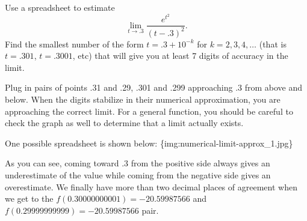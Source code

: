\documentclass{ximera}
\author{Emma Smith Zbarsky}
\begin{document}
\begin{exercise}

Use a spreadsheet to estimate
\[\lim_{t\to .3} \frac{e^{t^2}}{(t-.3)^2}.\] Find the smallest number of
the form $t=.3 + 10^{-k}$ for $k=2, 3, 4, \ldots$ (that is $t=.301$,
$t=.3001$, etc) that will give you at least 7 digits of accuracy in the
limit.


\begin{hint}
Plug in pairs of points .31 and .29, .301 and .299 approaching .3 from
above and below. When the digits stabilize in their numerical
approximation, you are approaching the correct limit. For a general
function, you should be careful to check the graph as well to determine
that a limit actually exists.
\end{hint}


\begin{hint}
One possible spreadsheet is shown below:
\{img:numerical-limit-approx\_1.jpg\}

As you can see, coming toward .3 from the positive side always gives an
underestimate of the value while coming from the negative side gives an
overestimate. We finally have more than two decimal places of agreement
when we get to the $f(0.30000000001) = -20.59987566$ and
$f(0.29999999999) = -20.59987566$ pair.
\end{hint}


\begin{multipleChoice}
\end{multipleChoice}

\end{exercise}
\end{document}
